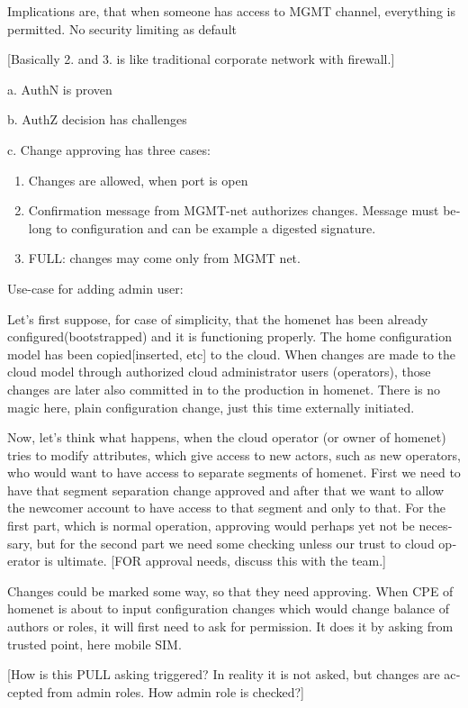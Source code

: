 \documentclass[12pt,a4paper,english]{tutthesis}
\begin{document}
\begin{otherlanguage}{english}
Implications are, that when someone has access to MGMT channel,
everything is permitted. No security limiting as default 

[Basically 2. and 3. is like traditional corporate network with firewall.]

a. AuthN is proven

b. AuthZ decision has challenges

c. Change approving has three cases:
\begin{enumerate}
\item Changes are allowed, when port is open
\item Confirmation message from MGMT-net authorizes changes.
Message must belong to configuration and can be example a digested signature.
\item FULL: changes may come only from MGMT net.
\end{enumerate}


Use-case for adding admin user:

Let's first suppose, for case of simplicity, that the homenet has been
already configured(bootstrapped) and it is functioning properly.  The
home configuration model has been copied[inserted, etc] to the cloud.
When changes are made to the cloud model through authorized cloud
administrator users (operators), those changes are later also committed
in to the production in homenet. There is no magic here, plain
configuration change, just this time externally initiated.

Now, let's think what happens, when the cloud operator (or owner of
homenet) tries to modify attributes, which give access to new actors,
such as new operators, who would want to have access to separate
segments of homenet.  First we need to have that segment separation
change approved and after that we want to allow the newcomer account
to have access to that segment and only to that. For the first part,
which is normal operation, approving would perhaps yet not be
necessary, but for the second part we need some checking unless our
trust to cloud operator is ultimate.  [FOR approval needs, discuss
this with the team.]



Changes could be marked some way, so that they need approving.
When CPE of homenet is about to input configuration
changes which would change balance of authors or roles,
it will first need to ask for permission. 
It does it by asking from trusted point, here mobile SIM. 

[How is this PULL asking triggered? In reality it is not asked, but
changes are accepted from admin roles. How admin role is checked?]


\end{otherlanguage}
\end{document}

